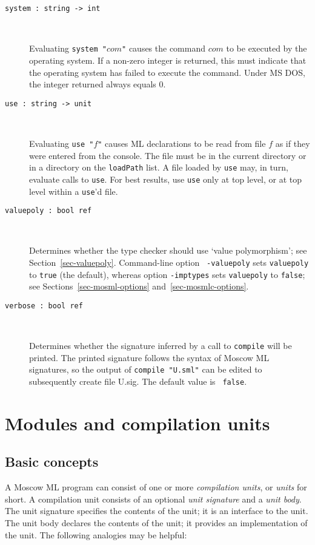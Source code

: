 \documentclass[fleqn]{article}
\begin{document}
\begin{description}
\item[{\tt system :\ string -> int}]\mbox{ }

  Evaluating {\tt system "$com$"} causes the command $com$ to be
  executed by the operating system.  If a non-zero integer is
  returned, this must indicate that the operating system has failed to
  execute the command.  Under MS DOS, the integer returned always
  equals 0.

\item[{\tt use :\ string -> unit}]\mbox{ }

  Evaluating {\tt use "$f$"} causes ML declarations to be read from
  file $f$ as if they were entered from the console.  The file must be
  in the current directory or in a directory on the {\tt loadPath}
  list.  A file loaded by {\tt use} may, in turn, evaluate calls to
  {\tt use}.  For best results, use {\tt use} only at top level, or at
  top level within a {\tt use}'d file.

\item[{\tt valuepoly :\ bool ref}]\mbox{ }

  Determines whether the type checker should use `value polymorphism';
  see Section~\ref{sec-valuepoly}.  Command-line option {\tt
    -valuepoly} sets {\tt valuepoly} to {\tt true} (the default),
  whereas option {\tt -imptypes} sets {\tt valuepoly} to {\tt false};
  see Sections~\ref{sec-mosml-options} and~\ref{sec-mosmlc-options}.

\item[{\tt verbose :\ bool ref}]\mbox{ }

  Determines whether the signature inferred by a call to {\tt compile}
  will be printed.  The printed signature follows the syntax of Moscow
  ML signatures, so the output of {\tt compile "{\rm U.sml}"} can be
  edited to subsequently create file U.sig.  The default value is {\tt
    false}.
\end{description}


\section{Modules and compilation units}
\label{sec-compilation-units}


\subsection{Basic concepts}

A Moscow ML program can consist of one or more {\em compilation
  units\/}, or {\em units\/} for short.  A compilation unit consists
of an optional {\em unit signature\/} and a {\em unit body\/}.  The
unit signature specifies the contents of the unit; it is an interface
to the unit.  The unit body declares the contents of the unit; it
provides an implementation of the unit.  The following analogies may
be helpful:
\end{document}
